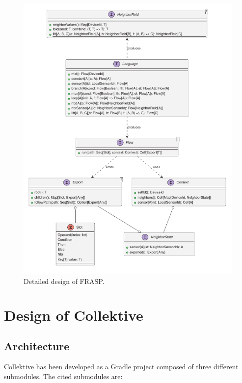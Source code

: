 \begin{figure}
    \centering
    \includegraphics[width=\linewidth]{figures/FRASP-design.pdf}
    \caption{Detailed design of FRASP.}
    \label{fig:frasp-design}
\end{figure}

\section{Design of Collektive}
\label{section:design-of-collektive}

\subsection{Architecture}

Collektive has been developed as a Gradle project composed of three different submodules. The cited submodules are:

